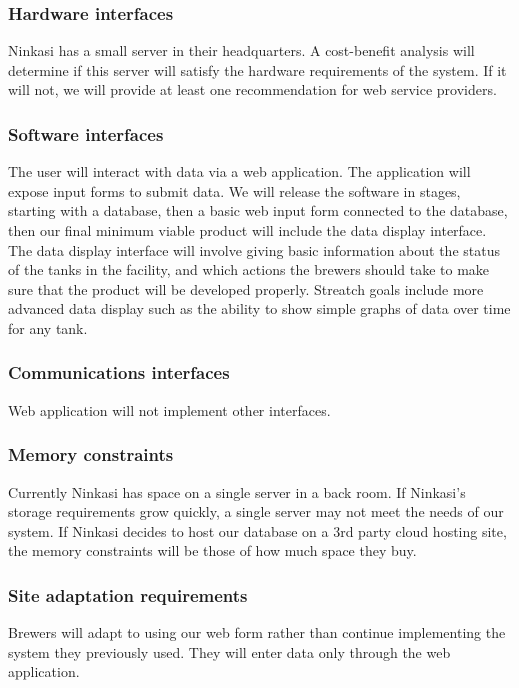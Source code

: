 \documentclass[draftclsnofoot,onecolumn,letterpaper,10pt,compsoc]{IEEEtran}
\begin{document}
		\subsubsection{Hardware interfaces}
			Ninkasi has a small server in their headquarters.
			A cost-benefit analysis will determine if this server will satisfy the hardware requirements of the system.
			If it will not, we will provide at least one recommendation for web service providers.

		\subsubsection{Software interfaces}
			The user will interact with data via a web application.
			The application will expose input forms to submit data.
			We will release the software in stages, starting with a database, then a basic web input form connected to the database, then our final minimum viable product will include the data display interface.
			The data display interface will involve giving basic information about the status of the tanks in the facility, and which actions the brewers should take to make sure that the product will be developed properly.
			Streatch goals include more advanced data display such as the ability to show simple graphs of data over time for any tank.

		\subsubsection{Communications interfaces}
			Web application will not implement other interfaces.

		\subsubsection{Memory constraints}
			Currently Ninkasi has space on a single server in a back room.
			If Ninkasi's storage requirements grow quickly, a single server may not meet the needs of our system.
			If Ninkasi decides to host our database on a 3rd party cloud hosting site, the memory constraints will be those of how much space they buy.

		\subsubsection{Site adaptation requirements}
			Brewers will adapt to using our web form rather than continue implementing the system they previously used.
			They will enter data only through the web application.
\end{document}
